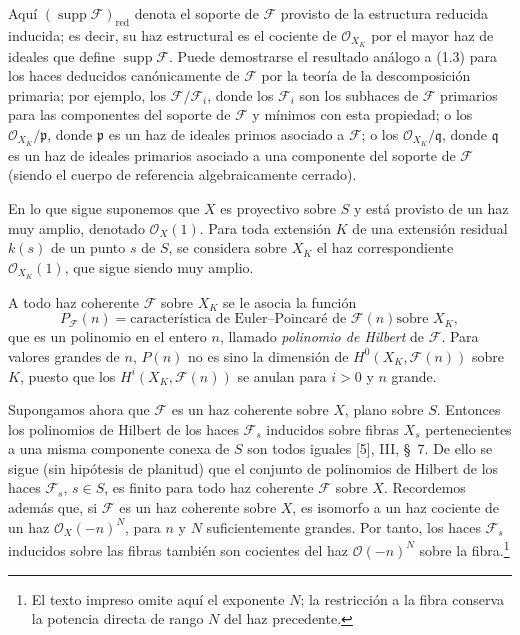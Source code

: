 Aquí $(\operatorname{supp}\mathcal F)_{\mathrm{red}}$ denota el soporte de
$\mathcal F$ provisto de la estructura reducida inducida; es decir, su haz
estructural es el cociente de $\mathcal O_{X_K}$ por el mayor haz de ideales
que define $\operatorname{supp}\mathcal F$. Puede demostrarse el resultado
análogo a (1.3) para los haces deducidos canónicamente de $\mathcal F$ por la
teoría de la descomposición primaria; por ejemplo, los
$\mathcal F/\mathcal F_i$, donde los $\mathcal F_i$ son los subhaces de
$\mathcal F$ primarios para las componentes del soporte de $\mathcal F$ y
mínimos con esta propiedad; o los $\mathcal O_{X_K}/\mathfrak p$, donde
$\mathfrak p$ es un haz de ideales primos asociado a $\mathcal F$; o los
$\mathcal O_{X_K}/\mathfrak q$, donde $\mathfrak q$ es un haz de ideales
primarios asociado a una componente del soporte de $\mathcal F$ (siendo el
cuerpo de referencia algebraicamente cerrado).


En lo que sigue suponemos que $X$ es proyectivo sobre $S$ y está provisto de
un haz muy amplio, denotado $\mathcal O_X(1)$. Para toda extensión $K$ de una
extensión residual $k(s)$ de un punto $s$ de $S$, se considera sobre $X_K$ el
haz correspondiente $\mathcal O_{X_K}(1)$, que sigue siendo muy amplio.

A todo haz coherente $\mathcal F$ sobre $X_K$ se le asocia la función
\[
P_{\mathcal F}(n)=\text{característica de Euler--Poincaré de $\mathcal F(n)$
sobre $X_K$},
\]
que es un polinomio en el entero $n$, llamado \emph{polinomio de Hilbert} de
$\mathcal F$. Para valores grandes de $n$, $P(n)$ no es sino la dimensión de
$H^0(X_K,\mathcal F(n))$ sobre $K$, puesto que los
$H^i(X_K,\mathcal F(n))$ se anulan para $i>0$ y $n$ grande.

Supongamos ahora que $\mathcal F$ es un haz coherente sobre $X$, plano sobre
$S$. Entonces los polinomios de Hilbert de los haces $\mathcal F_s$ inducidos
sobre fibras $X_s$ pertenecientes a una misma componente conexa de $S$ son
todos iguales [5], III, \S~7. De ello se sigue (sin hipótesis de planitud) que
el conjunto de polinomios de Hilbert de los haces $\mathcal F_s$, $s\in S$,
es finito para todo haz coherente $\mathcal F$ sobre $X$.
Recordemos además que, si $\mathcal F$ es un haz coherente sobre $X$, es
isomorfo a un haz cociente de un haz $\mathcal O_X(-n)^N$, para $n$ y $N$
suficientemente grandes. Por tanto, los haces $\mathcal F_s$ inducidos sobre
las fibras también son cocientes del haz $\mathcal O(-n)^N$ sobre la fibra.\footnote{El texto impreso omite aquí el exponente $N$; la restricción a la fibra conserva la potencia directa de rango $N$ del haz precedente.}

